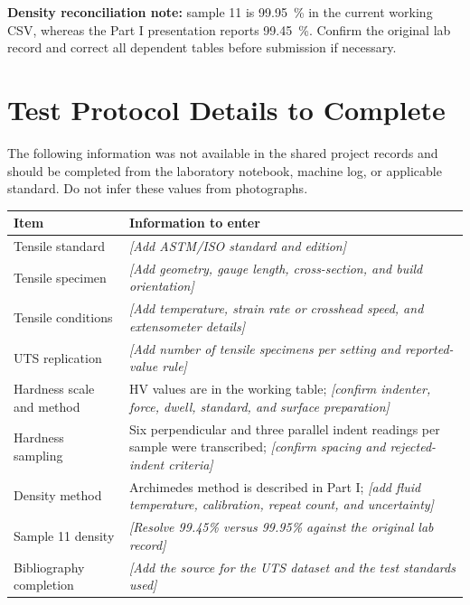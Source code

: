 \documentclass[12pt,a4paper,oneside]{report}
\begin{document}
\noindent\textbf{Density reconciliation note:} sample 11 is \SI{99.95}{\percent} in the current working CSV, whereas the Part I presentation reports \SI{99.45}{\percent}. Confirm the original lab record and correct all dependent tables before submission if necessary.

\chapter{Test Protocol Details to Complete}
The following information was not available in the shared project records and should be completed from the laboratory notebook, machine log, or applicable standard. Do not infer these values from photographs.
\begin{longtable}{p{}p{}}
\toprule
Item & Information to enter\\
\midrule
Tensile standard & \textit{[Add ASTM/ISO standard and edition]}\\
Tensile specimen & \textit{[Add geometry, gauge length, cross-section, and build orientation]}\\
Tensile conditions & \textit{[Add temperature, strain rate or crosshead speed, and extensometer details]}\\
UTS replication & \textit{[Add number of tensile specimens per setting and reported-value rule]}\\
Hardness scale and method & HV values are in the working table; \textit{[confirm indenter, force, dwell, standard, and surface preparation]}\\
Hardness sampling & Six perpendicular and three parallel indent readings per sample were transcribed; \textit{[confirm spacing and rejected-indent criteria]}\\
Density method & Archimedes method is described in Part I; \textit{[add fluid temperature, calibration, repeat count, and uncertainty]}\\
Sample 11 density & \textit{[Resolve 99.45\% versus 99.95\% against the original lab record]}\\
Bibliography completion & \textit{[Add the source for the UTS dataset and the test standards used]}\\
\bottomrule
\end{longtable}
\end{document}
